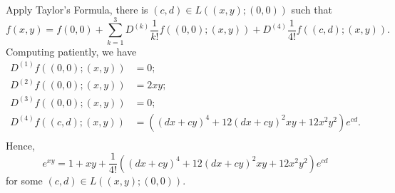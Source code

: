 \begin{Exercise}
\begin{enumerate}[a)]
\begin{solution}
Apply Taylor's Formula, there is $(c,d)\in L\left( (x,y); (0,0) \right)$ such that
$$
f(x,y) = f(0,0) + \sum_{k=1}^{3} D^{(k)} \frac{1}{k!} f\left( (0,0);(x,y)\right) + D^{(4)}\frac{1}{4!}f\left( (c,d);(x,y)\right).
$$
Computing patiently, we have
\begin{align*}
D^{(1)} f\left( (0,0);(x,y)\right) &= 0; \\
D^{(2)} f\left( (0,0);(x,y)\right) &= 2 x y; \\
D^{(3)} f\left( (0,0);(x,y)\right) &= 0; \\
D^{(4)} f\left( (c,d);(x,y)\right) 
&=  \left( (d x+c y)^4 + 12(d x+c y)^2 x y + 12x^2 y^2 \right) e^{c d}.\\
\end{align*}
Hence,
$$
e^{x y} = 1+x y + \frac{1}{4!} \left( (d x+c y)^4 + 12(d x+c y)^2 x y + 12x^2 y^2 \right) e^{c d}
$$
for some $(c,d)\in L\left( (x,y);(0,0) \right)$.
\end{solution}
\end{enumerate}
\end{Exercise}